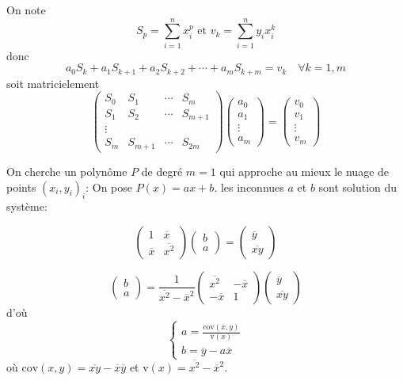 \documentclass{beamer}
\begin{document}
\begin{frame}
On note \[S_p =\sum_{i=1}^n x_i^p\mbox{ et }v_k =\sum^n_{i=1}y_ix^k_i\]
donc 
\[a_0S_k+ a_1S_{k+1} +a_2S_{k+2} +\cdots + a_mS_{k+m} = v_k\quad \forall k = 1,m\]
soit matricielement
\[\left(\begin{array}{cccc}
S_0 & S_1 & \cdots & S_m \\
S_1 & S_2 & \cdots & S_{m+1} \\
\vdots & & & \\
S_m & S_{m+1} & \cdots & S_{2m} 
\end{array}
\right) \left(\begin{array}{c}
a_0 \\
a_1 \\
\vdots \\
a_m
\end{array}
\right) =\left(\begin{array}{c}
v_0 \\
v_1 \\
\vdots \\
v_m
\end{array}
\right) 
\]
\end{frame}



\begin{frame}
On cherche un polynôme $P$ de degré $m=1$ qui approche au mieux le nuage de points $(x_i,y_i)_i$:
On pose $P(x)=ax+b$. les inconnues $a$ et $b$ sont solution du système:

\[\left(\begin{array}{cc}
1 & \overline{x} \\
\overline{x} & \overline{x^2} 
\end{array}\right) \left(\begin{array}{c}
b \\
a 
\end{array}
\right) =\left(\begin{array}{c}
\overline{y} \\
\overline{x y} 
\end{array}
\right) 
\]

\[\left(\begin{array}{c}
b \\
a 
\end{array}
\right)=\frac{1}{\overline{x^2}-\overline{x}^2}\left(\begin{array}{cc}
\overline{x^2} & -\overline{x} \\
-\overline{x} & 1 
\end{array}\right)  \left(\begin{array}{c}
\overline{y} \\
\overline{x y} 
\end{array}
\right) 
\]
d'où
\[\left\{\begin{array}{l}
a=\displaystyle{\frac{\mbox{cov}(x,y)}{\mbox{v}(x)}}\\
b=\overline{y}-a \overline{x}
\end{array}\right.
\]
où $\mbox{cov}(x,y)=\overline{x y}-\overline{x}\overline{y}$ et $\mbox{v}(x)=\overline{x^2}-\overline{x}^2$.



\end{frame}
\end{document}
